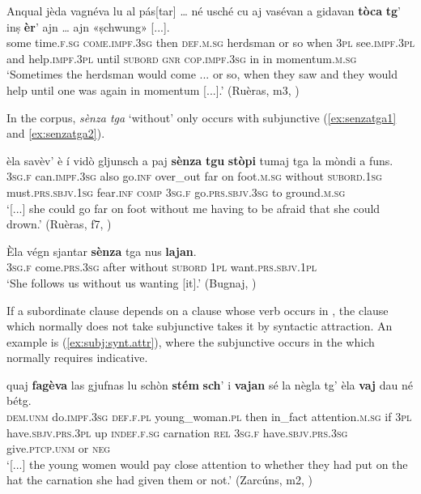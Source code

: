 \ea
\label{ex:toca:ind}
\gll  Anqual jèda vagnéva lu al pás[tar] … né usché cu aj vasévan a gidavan \textbf{tòca} \textbf{tg}’ inṣ \textbf{èr}’ ajn … ajn «ṣchwung» [...].\\
some time.\textsc{f.sg} \textsc{come.impf.3sg} then \textsc{def.m.sg} herdsman {} or so when \textsc{3pl} see.\textsc{impf.3pl} and help.\textsc{impf.3pl} until \textsc{subord} \textsc{gnr} \textsc{cop.impf.3sg} in {} in momentum.\textsc{m.sg}\\
\glt `Sometimes the herdsman would come ... or so, when they saw and they would help until one was again in momentum [...].' (Ruèras, m3, )
\z

In the corpus, \textit{sènza tga} `without' only occurs with subjunctive (\ref{ex:senzatga1} and \ref{ex:senzatga2}).

\ea
\label{ex:senzatga1}
\gll  [...] èla savèv’ è í vidò gljunsch a paj \textbf{sènza} \textbf{tgu} \textbf{stòpi} tumaj tga la mòndi a funs. \\
{} \textsc{3sg.f} can.\textsc{impf.3sg} also go.\textsc{inf} over\_out far on foot.\textsc{m.sg} without \textsc{subord.1sg} must.\textsc{prs.sbjv.1sg} fear.\textsc{inf} \textsc{comp} \textsc{3sg.f} go.\textsc{prs.sbjv.3sg} to ground.\textsc{m.sg}\\
\glt `[...] she could go far on foot without me having to be afraid that she could drown.' (Ruèras, f7, )
\z

\ea
\label{ex:senzatga2}
\gll Èla végn sjantar \textbf{sènza} tga nus \textbf{lajan}.\\
\textsc{3sg.f} come.\textsc{prs.3sg} after without \textsc{subord} \textsc{1pl} want.\textsc{prs.sbjv.1pl}\\
\glt `She follows us without us wanting [it].' (Bugnaj, \citealt[132]{Büchli1966})
\z

If a subordinate clause depends on a clause whose verb occurs in , the clause which normally does not take subjunctive takes it by syntactic attraction. An example is (\ref{ex:subj:synt.attr}), where the subjunctive occurs in the  which normally requires indicative.

\ea
\label{ex:subj:synt.attr}
	\gll    [...] quaj \textbf{fagèva} las gjufnas lu schòn \textbf{stém} \textbf{sch}’ i \textbf{vajan} sé la nègla tg’ èla \textbf{vaj} dau né bétg.\\
{} \textsc{dem.unm} do.\textsc{impf.3sg} \textsc{def.f.pl} young\_woman.\textsc{pl} then in\_fact attention.\textsc{m.sg} if \textsc{3pl}  have.\textsc{sbjv.prs.3pl} up \textsc{indef.f.sg} carnation \textsc{rel} \textsc{3sg.f} have.\textsc{sbjv.prs.3sg}  give.\textsc{ptcp.unm} or \textsc{neg} \\
\glt `[...] the young women would pay close attention to whether they had put on the hat the carnation she had given them or not.' (Zarcúns, m2, )
\z

